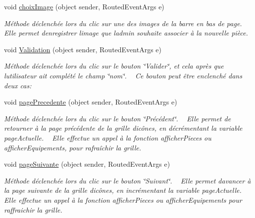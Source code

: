 \begin{DoxyCompactItemize}
void \hyperlink{class_my_domotik_1_1_gestion_pieces_a1aba6ee1fd4d3e9010c63e94cee34972}{choix\+Image} (object sender, Routed\+Event\+Args e)
\begin{DoxyCompactList}\small\item\em Méthode déclenchée lors du clic sur une des images de la barre en bas de page. ~\newline
Elle permet d\textquotesingle{}enregistrer l\textquotesingle{}image que l\textquotesingle{}admin souhaite associer à la nouvelle pièce. \end{DoxyCompactList}\item 
void \hyperlink{class_my_domotik_1_1_gestion_pieces_a86175c47096c64cb7e8d632470b24bea}{Validation} (object sender, Routed\+Event\+Args e)
\begin{DoxyCompactList}\small\item\em Méthode déclenchée lors du clic sur le bouton \char`\"{}\+Valider\char`\"{}, et cela après que l\textquotesingle{}utilisateur ait complété le champ \char`\"{}nom\char`\"{}. ~\newline
Ce bouton peut être enclenché dans deux cas\+: ~\newline
\end{DoxyCompactList}\item 
void \hyperlink{class_my_domotik_1_1_gestion_pieces_ad5792576098ea51af69b58c8585721a7}{page\+Precedente} (object sender, Routed\+Event\+Args e)
\begin{DoxyCompactList}\small\item\em Méthode déclenchée lors du clic sur le bouton \char`\"{}\+Précédent\char`\"{}. ~\newline
Elle permet de retourner à la page précédente de la grille d\textquotesingle{}icônes, en décrémentant la variable page\+Actuelle. ~\newline
Elle effectue un appel à la fonction afficher\+Pieces ou afficher\+Equipements, pour rafraîchir la grille. \end{DoxyCompactList}\item 
void \hyperlink{class_my_domotik_1_1_gestion_pieces_af7d90f9059ae38b539ed30f424790006}{page\+Suivante} (object sender, Routed\+Event\+Args e)
\begin{DoxyCompactList}\small\item\em Méthode déclenchée lors du clic sur le bouton \char`\"{}\+Suivant\char`\"{}. ~\newline
Elle permet d\textquotesingle{}avancer à la page suivante de la grille d\textquotesingle{}icônes, en incrémentant la variable page\+Actuelle. ~\newline
Elle effectue un appel à la fonction afficher\+Pieces ou afficher\+Equipements pour raffraichir la grille. \end{DoxyCompactList}\end{DoxyCompactItemize}
